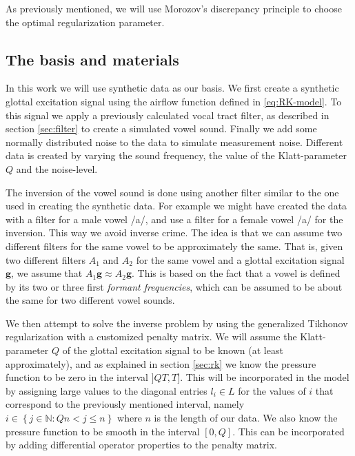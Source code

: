 \documentclass[12pt,a4]{article}
\newcommand{\N}{{\mathbb N}}
\newcommand{\vc}[1]{\ensuremath{\bm{#1}}}
\begin{document}
As previously mentioned, we will use Morozov's discrepancy principle to choose the optimal regularization parameter.


\subsection{The basis and materials}\label{sec:basis}

In this work we will use synthetic data as our basis. We first create a synthetic glottal excitation signal using the airflow function defined in \eqref{eq:RK-model}. To this signal we apply a previously calculated vocal tract filter, as described in section \ref{sec:filter} to create a simulated vowel sound. Finally we add some normally distributed noise to the data to simulate measurement noise. Different data is created by varying the sound frequency, the value of the Klatt-parameter $Q$ and the noise-level.

The inversion of the vowel sound is done using another filter similar to the one used in creating the synthetic data. For example we might have created the data with a filter for a male vowel /a/, and use a filter for a female vowel /a/ for the inversion. This way we avoid inverse crime. The idea is that we can assume two different filters for the same vowel to be approximately the same. That is, given two different filters $A_1$ and $A_2$ for the same vowel and a glottal excitation signal $\vc{g}$, we assume that $A_1 \vc{g} \approx A_2 \vc{g}$. This is based on the fact that a vowel is defined by its two or three first \emph{formant frequencies}, which can be assumed to be about the same for two different vowel sounds.\cite{digitalmodels}

We then attempt to solve the inverse problem by using the generalized Tikhonov regularization with a customized penalty matrix. We will assume the Klatt-parameter $Q$ of the glottal excitation signal to be known (at least approximately), and as explained in section \ref{sec:rk} we know the pressure function to be zero in the interval $]QT, T]$. This will be incorporated in the model by assigning large values to the diagonal entries $l_i \in L$ for the values of $i$ that correspond to the previously mentioned interval, namely $i \in \left\{ j \in \N : Qn < j \leq n \right\}$ where $n$ is the length of our data. We also know the pressure function to be smooth in the interval $[0, Q]$. This can be incorporated by adding differential operator properties to the penalty matrix.
\end{document}
